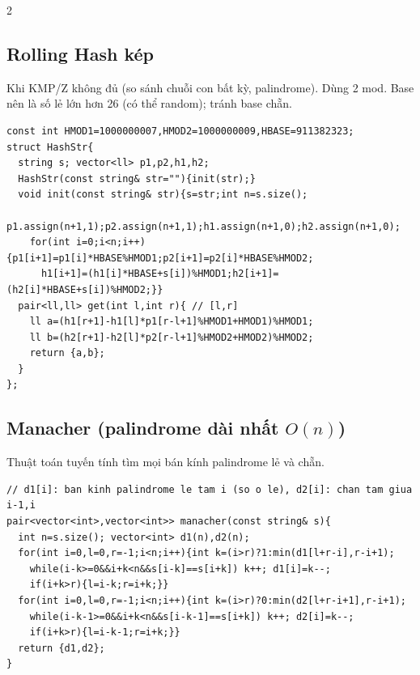 \documentclass[8pt]{extarticle}
\begin{document}
\begin{multicols}{2}
\subsection{Rolling Hash kép}
Khi KMP/Z không đủ (so sánh chuỗi con bất kỳ, palindrome). Dùng 2 mod. Base nên là số lẻ lớn hơn 26 (có thể random); tránh base chẵn.
\begin{lstlisting}
const int HMOD1=1000000007,HMOD2=1000000009,HBASE=911382323;
struct HashStr{
  string s; vector<ll> p1,p2,h1,h2;
  HashStr(const string& str=""){init(str);}
  void init(const string& str){s=str;int n=s.size();
    p1.assign(n+1,1);p2.assign(n+1,1);h1.assign(n+1,0);h2.assign(n+1,0);
    for(int i=0;i<n;i++){p1[i+1]=p1[i]*HBASE%HMOD1;p2[i+1]=p2[i]*HBASE%HMOD2;
      h1[i+1]=(h1[i]*HBASE+s[i])%HMOD1;h2[i+1]=(h2[i]*HBASE+s[i])%HMOD2;}}
  pair<ll,ll> get(int l,int r){ // [l,r]
    ll a=(h1[r+1]-h1[l]*p1[r-l+1]%HMOD1+HMOD1)%HMOD1;
    ll b=(h2[r+1]-h2[l]*p2[r-l+1]%HMOD2+HMOD2)%HMOD2;
    return {a,b};
  }
};
\end{lstlisting}

\subsection{Manacher (palindrome dài nhất $O(n)$)}
Thuật toán tuyến tính tìm mọi bán kính palindrome lẻ và chẵn.
\begin{lstlisting}
// d1[i]: ban kinh palindrome le tam i (so o le), d2[i]: chan tam giua i-1,i
pair<vector<int>,vector<int>> manacher(const string& s){
  int n=s.size(); vector<int> d1(n),d2(n);
  for(int i=0,l=0,r=-1;i<n;i++){int k=(i>r)?1:min(d1[l+r-i],r-i+1);
    while(i-k>=0&&i+k<n&&s[i-k]==s[i+k]) k++; d1[i]=k--;
    if(i+k>r){l=i-k;r=i+k;}}
  for(int i=0,l=0,r=-1;i<n;i++){int k=(i>r)?0:min(d2[l+r-i+1],r-i+1);
    while(i-k-1>=0&&i+k<n&&s[i-k-1]==s[i+k]) k++; d2[i]=k--;
    if(i+k>r){l=i-k-1;r=i+k;}}
  return {d1,d2};
}
\end{lstlisting}


\end{multicols}
\end{document}
